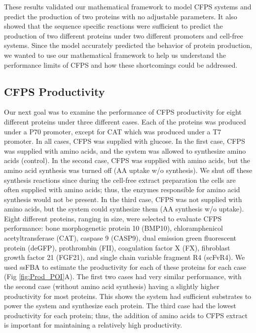\documentclass[journal=asbcd6,manuscript=article]{achemso}
\begin{document}
These results validated our mathematical framework to model CFPS systems and predict the production of two proteins with no adjustable parameters.
It also showed that the sequence specific reactions were sufficient to predict the production of two different proteins under two different promoters and cell-free systems.
Since the model accurately predicted the behavior of protein production, we wanted to use our mathematical framework to help us understand the performance limits of CFPS and how these shortcomings could be addressed.

\subsection{CFPS Productivity}
Our next goal was to examine the performance of CFPS productivity for eight different proteins under three different cases.
Each of the proteins was produced under a P70 promoter, except for CAT which was produced under a T7 promoter.
In all cases, CFPS was supplied with glucose.
In the first case, CFPS was supplied with amino acids, and the system was allowed to synthesize amino acids (control).
In the second case, CFPS was supplied with amino acids, but the amino acid synthesis was turned off (AA uptake w/o synthesis).
We shut off these synthesis reactions since during the cell-free extract preparation the cells are often supplied with amino acids; thus, the enzymes responsible for amino acid synthesis would not be present.
In the third case, CFPS was not supplied with amino acids, but the system could synthesize them (AA synthesis w/o uptake).
Eight different proteins, ranging in size, were selected to evaluate CFPS performance: bone morphogenetic protein 10 (BMP10), chloramphenicol acetyltransferase (CAT), caspase 9 (CASP9), dual emission green fluorescent protein (deGFP), prothrombin (FII), coagulation factor X (FX), fibroblast growth factor 21 (FGF21), and single chain variable fragment R4 (scFvR4).
We used ssFBA to estimate the productivity for each of these proteins for each case (Fig \ref{fig:Prod_POI}A).
The first two cases had very similar performance, with the second case (without amino acid synthesis) having a slightly higher productivity for most proteins. 
This shows the system had sufficient substrates to power the system and synthesize each protein.
The third case had the lowest productivity for each protein; thus, the addition of amino acids to CFPS extract is important for maintaining a relatively high productivity.
\end{document}
